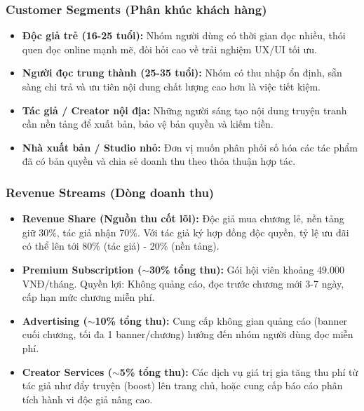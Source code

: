 \subsubsection{Customer Segments (Phân khúc khách hàng)}
\begin{itemize}
    \item \textbf{Độc giả trẻ (16-25 tuổi):} Nhóm người dùng có thời gian đọc nhiều, thói quen đọc online mạnh mẽ, đòi hỏi cao về trải nghiệm UX/UI tối ưu.
    \item \textbf{Người đọc trung thành (25-35 tuổi):} Nhóm có thu nhập ổn định, sẵn sàng chi trả và ưu tiên nội dung chất lượng cao hơn là việc tiết kiệm.
    \item \textbf{Tác giả / Creator nội địa:} Những người sáng tạo nội dung truyện tranh cần nền tảng để xuất bản, bảo vệ bản quyền và kiếm tiền.
    \item \textbf{Nhà xuất bản / Studio nhỏ:} Đơn vị muốn phân phối số hóa các tác phẩm đã có bản quyền và chia sẻ doanh thu theo thỏa thuận hợp tác.
\end{itemize}

\subsubsection{Revenue Streams (Dòng doanh thu)}
\begin{itemize}
    \item \textbf{Revenue Share (Nguồn thu cốt lõi):} Độc giả mua chương lẻ, nền tảng giữ 30\%, tác giả nhận 70\%. Với tác giả ký hợp đồng độc quyền, tỷ lệ ưu đãi có thể lên tới 80\% (tác giả) - 20\% (nền tảng).
    \item \textbf{Premium Subscription ($\sim$30\% tổng thu):} Gói hội viên khoảng 49.000 VNĐ/tháng. Quyền lợi: Không quảng cáo, đọc trước chương mới 3-7 ngày, cấp hạn mức chương miễn phí.
    \item \textbf{Advertising ($\sim$10\% tổng thu):} Cung cấp không gian quảng cáo (banner cuối chương, tối đa 1 banner/chương) hướng đến nhóm người dùng đọc miễn phí.
    \item \textbf{Creator Services ($\sim$5\% tổng thu):} Các dịch vụ giá trị gia tăng thu phí từ tác giả như đẩy truyện (boost) lên trang chủ, hoặc cung cấp báo cáo phân tích hành vi độc giả nâng cao.
\end{itemize}

